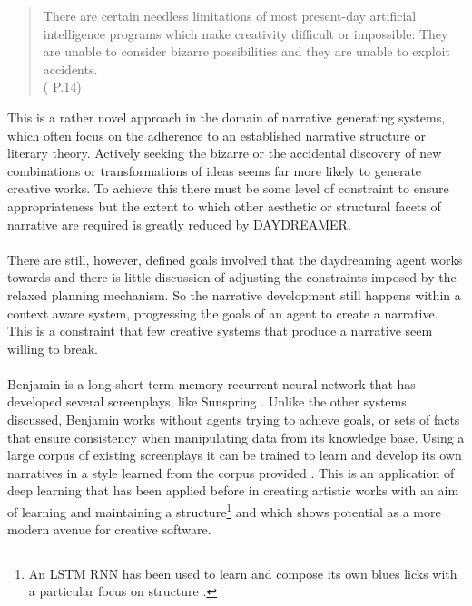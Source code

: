 \documentclass[letterpaper]{article}
\begin{document}
\begin{quote}
There are certain needless limitations of most present-day artificial intelligence programs which make creativity difficult or impossible: They are unable to consider bizarre possibilities and they are unable to exploit accidents.\\
(\citeauthor{Mueller:1990:DHM:77492} \citeyear{Mueller:1990:DHM:77492} P.14)
\end{quote}
This is a rather novel approach in the domain of narrative generating systems, which often focus on the adherence to an established narrative structure or literary theory. Actively seeking the bizarre or the accidental discovery of new combinations or transformations of ideas seems far more likely to generate creative works. To achieve this there must be some level of constraint to ensure appropriateness but the extent to which other aesthetic or structural facets of narrative are required is greatly reduced by DAYDREAMER.\\
\\There are still, however, defined goals involved that the daydreaming agent works towards and there is little discussion of adjusting the constraints imposed by the relaxed planning mechanism. So the narrative development still happens within a context aware system, progressing the goals of an agent to create a narrative. This is a constraint that few creative systems that produce a narrative seem willing to break.\\
\\Benjamin is a long short-term memory recurrent neural network that has developed several screenplays, like Sunspring \cite{SunspringScreenplay}. Unlike the other systems discussed, Benjamin works without agents trying to achieve goals, or sets of facts that ensure consistency when manipulating data from its knowledge base. Using a large corpus of existing screenplays it can be trained to learn and develop its own narratives in a style learned from the corpus provided \cite{githubUniverseTalk}. This is an application of deep learning that has been applied before in creating artistic works with an aim of learning and maintaining a structure\footnote{An LSTM RNN has been used to learn and compose its own blues licks with a particular focus on structure \cite{Eck2002}.} and which shows potential as a more modern avenue for creative software.\\
\end{document}
